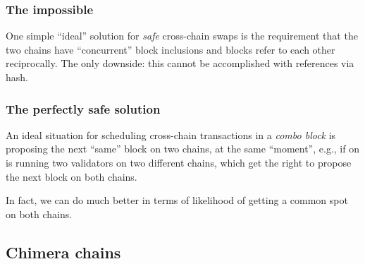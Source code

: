 \documentclass{article}
\theoremstyle{definition}
\begin{document}
\subsubsection{The impossible}
\label{sec:impossible-concurrency}

One simple 
``ideal'' solution for \emph{safe}
cross-chain swaps is the requirement that
the two chains have
``concurrent'' block inclusions
and blocks refer to each other reciprocally.
The only downside:
this cannot be accomplished with references via hash.

\subsubsection{The perfectly safe solution}
\label{sec:perfectly-safe}

An ideal situation for
scheduling cross-chain transactions
in a \emph{combo block}  
is proposing the next ``same'' block on two chains,
at the same “moment”,
e.g., if on is running two validators on two different chains,
which get the right to propose the next block on both chains.

In fact, 
we can do much better
in terms of likelihood of getting a common spot
on both chains.





















\subsection{Chimera chains}
\label{sec:chimera-chains}
\end{document}
